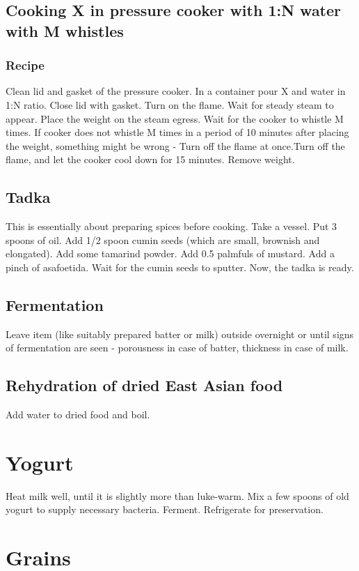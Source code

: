 \documentclass[oneside, article]{memoir}
\begin{document}
\section{Cooking X in pressure cooker with 1:N water with M whistles}
\subsection{Recipe}
Clean lid and gasket of the pressure cooker. In a container pour X and water in 1:N ratio. Close lid with gasket. Turn on the flame. Wait for steady steam to appear. Place the weight on the steam egress. Wait for the cooker to whistle M times. If cooker does not whistle M times in a period of 10 minutes after placing the weight, something might be wrong - Turn off the flame at once.Turn off the flame, and let the cooker cool down for 15 minutes. Remove weight.

\section{Tadka}
This is essentially about preparing spices before cooking. Take a vessel. Put 3 spoons of oil. Add 1/2 spoon cumin seeds (which are small, brownish and elongated). Add some tamarind powder. Add 0.5 palmfuls of mustard. Add a pinch of asafoetida. Wait for the cumin seeds to sputter. Now, the tadka is ready.

\section{Fermentation}
Leave item (like suitably prepared batter or milk) outside overnight or until signs of fermentation are seen - porousness in case of batter, thickness in case of milk.

\section{Rehydration of dried East Asian food}
Add water to dried food and boil.

\chapter{Yogurt}
Heat milk well, until it is slightly more than luke-warm. Mix a few spoons of old yogurt to supply necessary bacteria. Ferment. Refrigerate for preservation.

\chapter{Grains}
\end{document}
